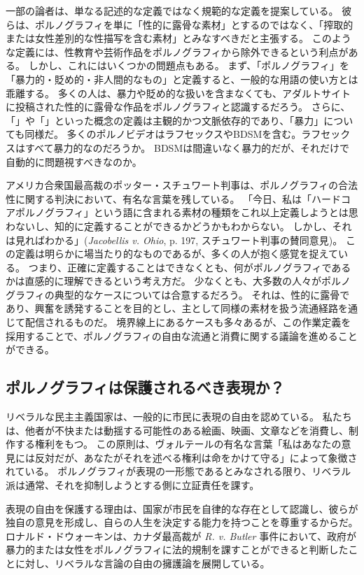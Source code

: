 \documentclass[paper=a4,book,openany]{jlreq}
\newcommand{\ig}[1]{}           %
\begin{document}
一部の論者は、単なる記述的な定義ではなく規範的な定義を提案している。
彼らは、ポルノグラフィを単に「性的に露骨な素材」とするのではなく、「搾取的または女性差別的な性描写を含む素材」とみなすべきだと主張する。
このような定義には、性教育や芸術作品をポルノグラフィから除外できるという利点がある。
しかし、これにはいくつかの問題点もある。
まず、「ポルノグラフィ」を「暴力的・貶め的・非人間的なもの」と定義すると、一般的な用語の使い方とは乖離する。
多くの人は、暴力や貶め的な扱いを含まなくても、アダルトサイトに投稿された性的に露骨な作品をポルノグラフィと認識するだろう。
さらに、「」や「」といった概念の定義は主観的かつ文脈依存的であり、「暴力」についても同様だ。
多くのポルノビデオはラフセックスやBDSMを含む。ラフセックスはすべて暴力的なのだろうか。
BDSMは間違いなく暴力的だが、それだけで自動的に問題視すべきなのか。

アメリカ合衆国最高裁のポッター・スチュワート判事は、ポルノグラフィの合法性に関する判決において、有名な言葉を残している。
「今日、私は「ハードコアポルノグラフィ」という語に含まれる素材の種類をこれ以上定義しようとは思わないし、知的に定義することができるかどうかもわからない。
しかし、それは見ればわかる」(\emph{Jacobellis v. Ohio}, p. 197, スチュワート判事の賛同意見)。
この定義は明らかに場当たり的なものであるが、多くの人が抱く感覚を捉えている。
つまり、正確に定義することはできなくとも、何がポルノグラフィであるかは直感的に理解できるという考え方だ。
少なくとも、大多数の人々がポルノグラフィの典型的なケースについては合意するだろう。
それは、性的に露骨であり、興奮を誘発することを目的とし、主として同様の素材を扱う流通経路を通じて配信されるものだ。
境界線上にあるケースも多々あるが、この作業定義を採用することで、ポルノグラフィの自由な流通と消費に関する議論を進めることができる。

\subsection{ポルノグラフィは保護されるべき表現か？}

リベラルな民主主義国家は、一般的に市民に表現の自由を認めている。
私たちは、他者が不快または動揺する可能性のある絵画、映画、文章などを消費し、制作する権利をもつ。
この原則は、ヴォルテールの有名な言葉「私はあなたの意見には反対だが、あなたがそれを述べる権利は命をかけて守る」によって象徴されている。
ポルノグラフィが表現の一形態であるとみなされる限り、リベラル派は通常、それを抑制しようとする側に立証責任を課す。

表現の自由を保護する理由は、国家が市民を自律的な存在として認識し、彼らが独自の意見を形成し、自らの人生を決定する能力を持つことを尊重するからだ。
ロナルド・ドウォーキン\ig{Ronald Dworkin}は、カナダ最高裁が \emph{R. v. Butler} 事件において、政府が暴力的または女性をポルノグラフィに法的規制を課すことができると判断したことに対し、リベラルな言論の自由の擁護論を展開している。
\end{document}
